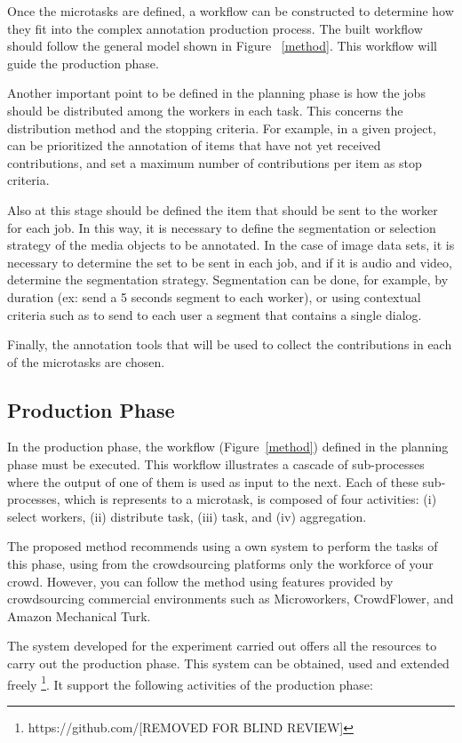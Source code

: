 Once the microtasks are defined, a workflow can be constructed to determine how they fit into the complex annotation production process. The built workflow should follow the general model shown in Figure ~\ref{method}. This workflow will guide the production phase.

Another important point to be defined in the planning phase is how the jobs should be distributed among the workers in each task. This concerns the distribution method and the stopping criteria. For example, in a given project, can be prioritized the annotation of items that have not yet received contributions, and set a maximum number of contributions per item as stop criteria.

Also at this stage should be defined the item that should be sent to the worker for each job. In this way, it is necessary to define the segmentation or selection strategy of the media objects to be annotated. In the case of image data sets, it is necessary to determine the set to be sent in each job, and if it is audio and video, determine the segmentation strategy. Segmentation can be done, for example, by duration (ex: send a 5 seconds segment to each worker), or using contextual criteria such as to send to each user a segment that contains a single dialog.

Finally, the annotation tools that will be used to collect the contributions in each of the microtasks are chosen.


\subsection{Production Phase}
In the production phase, the workflow (Figure~\ref{method}) defined in the planning phase must be executed. This workflow illustrates a cascade of sub-processes where the output of one of them is used as input to the next. Each of these sub-processes, which is represents to a microtask, is composed of four activities: (i) select workers, (ii) distribute task, (iii) task, and (iv) aggregation.

The proposed method recommends using a own system to perform the tasks of this phase, using from the crowdsourcing platforms only the workforce of your crowd. However, you can follow the method using features provided by crowdsourcing commercial environments such as Microworkers, CrowdFlower, and Amazon Mechanical Turk.

The system developed for the experiment carried out offers all the resources to carry out the production phase. This system can be obtained, used and extended freely \footnote{https://github.com/[REMOVED FOR BLIND REVIEW]}. It support the following activities of the production phase:

